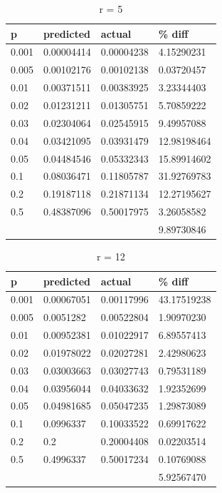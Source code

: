 \documentclass[a4paper,11pt]{article}
\begin{document}
        \begin{table}
        \centering
            \caption {r = 5}
            \label{table:r5}
            \begin{tabular}{l|lll}
             p    & predicted  & actual     & \% diff     \\ \hline
            0.001 & 0.00004414 & 0.00004238 & 4.15290231  \\
            0.005 & 0.00102176 & 0.00102138 & 0.03720457  \\
            0.01  & 0.00371511 & 0.00383925 & 3.23344403  \\
            0.02  & 0.01231211 & 0.01305751 & 5.70859222  \\
            0.03  & 0.02304064 & 0.02545915 & 9.49957088  \\
            0.04  & 0.03421095 & 0.03931479 & 12.98198464 \\
            0.05  & 0.04484546 & 0.05332343 & 15.89914602 \\
            0.1   & 0.08036471 & 0.11805787 & 31.92769783 \\
            0.2   & 0.19187118 & 0.21871134 & 12.27195627 \\
            0.5   & 0.48387096 & 0.50017975 & 3.26058582  \\ \hline
            ~     & ~          & ~          & 9.89730846  \\
            \end{tabular}
        \end{table}

        \begin{table}
        \centering
            \caption {r = 12}
            \label{table:r12}
            \begin{tabular}{l|lll}
             p    & predicted  & actual     & \% diff     \\ \hline
            0.001 & 0.00067051 & 0.00117996 & 43.17519238 \\
            0.005 & 0.0051282  & 0.00522804 & 1.90970230  \\
            0.01  & 0.00952381 & 0.01022917 & 6.89557413  \\
            0.02  & 0.01978022 & 0.02027281 & 2.42980623  \\
            0.03  & 0.03003663 & 0.03027743 & 0.79531189  \\
            0.04  & 0.03956044 & 0.04033632 & 1.92352699  \\
            0.05  & 0.04981685 & 0.05047235 & 1.29873089  \\
            0.1   & 0.0996337  & 0.10033522 & 0.69917622  \\
            0.2   & 0.2        & 0.20004408 & 0.02203514  \\
            0.5   & 0.4996337  & 0.50017234 & 0.10769088  \\ \hline
            ~     & ~          & ~          & 5.92567470  \\
            \end{tabular}
        \end{table}
\end{document}
